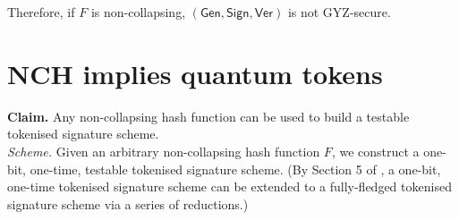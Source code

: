 \documentclass{article}
\begin{document}
Therefore, if $F$ is non-collapsing, $\mathsf{(Gen, Sign, Ver)}$ is not GYZ-secure.


\section{NCH implies quantum tokens}

\textbf{Claim.} Any non-collapsing hash function can be used to build a testable tokenised signature scheme. \\

\noindent \textit{Scheme.} Given an arbitrary non-collapsing hash function $F$, we construct a one-bit, one-time, testable tokenised signature scheme. (By Section 5 of \cite{tokens}, a one-bit, one-time tokenised signature scheme can be extended to a fully-fledged tokenised signature scheme via a series of reductions.)
\end{document}

